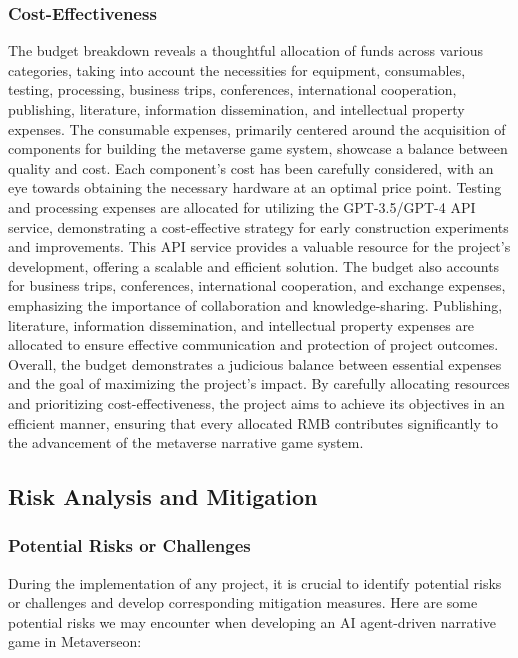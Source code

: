 \subsubsection{Cost-Effectiveness}
The budget breakdown reveals a thoughtful allocation of funds across various categories, taking into account the necessities for equipment, consumables, testing, processing, business trips, conferences, international cooperation, publishing, literature, information dissemination, and intellectual property expenses. 
The consumable expenses, primarily centered around the acquisition of components for building the metaverse game system, showcase a balance between quality and cost. 
Each component's cost has been carefully considered, with an eye towards obtaining the necessary hardware at an optimal price point. 
Testing and processing expenses are allocated for utilizing the GPT-3.5/GPT-4 API service, demonstrating a cost-effective strategy for early construction experiments and improvements. 
This API service provides a valuable resource for the project's development, offering a scalable and efficient solution. 
The budget also accounts for business trips, conferences, international cooperation, and exchange expenses, emphasizing the importance of collaboration and knowledge-sharing. 
Publishing, literature, information dissemination, and intellectual property expenses are allocated to ensure effective communication and protection of project outcomes. 
Overall, the budget demonstrates a judicious balance between essential expenses and the goal of maximizing the project's impact. 
By carefully allocating resources and prioritizing cost-effectiveness, the project aims to achieve its objectives in an efficient manner, ensuring that every allocated RMB contributes significantly to the advancement of the metaverse narrative game system.

\subsection{Risk Analysis and Mitigation}

\subsubsection{Potential Risks or Challenges}
During the implementation of any project, it is crucial to identify potential risks or challenges and develop corresponding mitigation measures. 
Here are some potential risks we may encounter when developing an AI agent-driven narrative game in Metaverseon:

